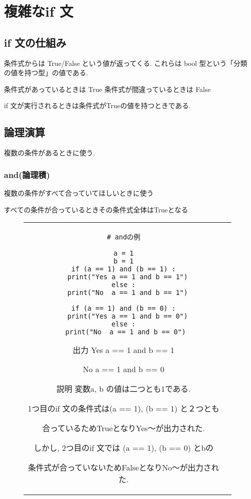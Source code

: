 \documentclass{jsarticle}
\begin{document}
\section{複雑なif 文}
\subsection{if 文の仕組み}
条件式からは True/False という値が返ってくる. これらは bool 型という「分類の値を持つ型」の値である.  \par
条件式があっているときは True
条件式が間違っているときは False \par
if 文が実行されるときは条件式がTrueの値を持つときである.
\subsection{論理演算}
複数の条件があるときに使う.
\subsubsection{and(論理積)}
複数の条件がすべて合っていてほしいときに使う \par
すべての条件が合っているときその条件式全体はTrueとなる
\vspace{-5mm}
\begin{figure}[h]
	\begin{tabular}{cc}
		\begin{minipage}[t]{.4\textwidth}
			\begin{lstlisting}[caption=and]
# andの例

a = 1
b = 1
if (a == 1) and (b == 1) :
  print("Yes a == 1 and b == 1")
else :
  print("No  a == 1 and b == 1")

if (a == 1) and (b == 0) :
  print("Yes a == 1 and b == 0")
else :
  print("No  a == 1 and b == 0") \end{lstlisting}
		\end{minipage} \hspace{5mm}
		\begin{minipage}[t]{.6\textwidth}
			\begin{minipage}[t]{.5\textwidth}
				\begin{itembox}[l]{出力}
					Yes a == 1 and b == 1 \par
					No\; a == 1 and b == 0 \par
				\end{itembox}
			\end{minipage}
			\begin{itembox}[l]{説明}
				変数a, b の値は二つとも1である.  \par
				1つ目のif 文の条件式は(a == 1), (b == 1) と２つとも \par 合っているためTrueとなりYes～が出力された.  \par
				しかし, 2つ目のif 文では (a == 1), (b == 0) とbの \par 条件式が合っていないためFalseとなりNo～が出力された.  \par
			\end{itembox}

		\end{minipage} \hspace{5mm}
	\end{tabular}
\end{figure}
\newpage
\end{document}
